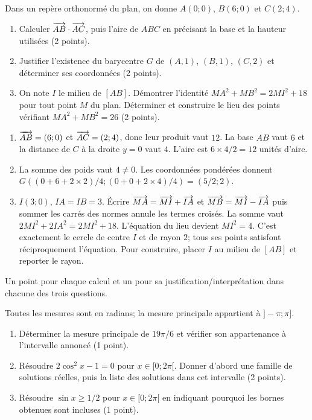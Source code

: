 \label{t11s-ds3-e01}\par
Dans un repère orthonormé du plan, on donne $A(0;0)$, $B(6;0)$ et $C(2;4)$.
\begin{enumerate}
\item Calculer $\overrightarrow{AB}\cdot\overrightarrow{AC}$, puis l’aire de $ABC$ en précisant la base et la hauteur utilisées (2 points).
\item Justifier l’existence du barycentre $G$ de $(A,1)$, $(B,1)$, $(C,2)$ et déterminer ses coordonnées (2 points).
\item On note $I$ le milieu de $[AB]$. Démontrer l’identité $MA^2+MB^2=2MI^2+18$ pour tout point $M$ du plan. Déterminer et construire le lieu des points vérifiant $MA^2+MB^2=26$ (2 points).
\end{enumerate}
\begin{corrige}\label{sol-t11s-ds3-e01}
\begin{enumerate}
\item $\overrightarrow{AB}=(6;0)$ et $\overrightarrow{AC}=(2;4)$, donc leur produit vaut $12$. La base $AB$ vaut $6$ et la distance de $C$ à la droite $y=0$ vaut $4$. L’aire est $6\times4/2=12$ unités d’aire.
\item La somme des poids vaut $4\ne0$. Les coordonnées pondérées donnent $G((0+6+2\times2)/4;(0+0+2\times4)/4)=(5/2;2)$.
\item $I(3;0)$, $IA=IB=3$. Écrire $\overrightarrow{MA}=\overrightarrow{MI}+\overrightarrow{IA}$ et $\overrightarrow{MB}=\overrightarrow{MI}-\overrightarrow{IA}$ puis sommer les carrés des normes annule les termes croisés. La somme vaut $2MI^2+2IA^2=2MI^2+18$. L’équation du lieu devient $MI^2=4$. C’est exactement le cercle de centre $I$ et de rayon $2$; tous ses points satisfont réciproquement l’équation. Pour construire, placer $I$ au milieu de $[AB]$ et reporter le rayon.
\end{enumerate}
Un point pour chaque calcul et un pour sa justification/interprétation dans chacune des trois questions.
\end{corrige}
\label{t11s-ds3-e02}\par
Toutes les mesures sont en radians; la mesure principale appartient à $]-\pi;\pi]$.
\begin{enumerate}
\item Déterminer la mesure principale de $19\pi/6$ et vérifier son appartenance à l’intervalle annoncé (1 point).
\item Résoudre $2\cos^2x-1=0$ pour $x\in[0;2\pi[$. Donner d’abord une famille de solutions réelles, puis la liste des solutions dans cet intervalle (2 points).
\item Résoudre $\sin x\ge1/2$ pour $x\in[0;2\pi[$ en indiquant pourquoi les bornes obtenues sont incluses (1 point).
\end{enumerate}

